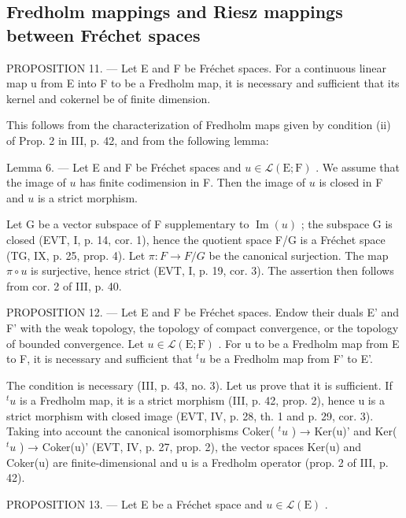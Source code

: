 \subsection{Fredholm mappings and Riesz mappings between Fréchet spaces}

PROPOSITION 11. --- Let E and F be Fréchet spaces. For a continuous linear map u from E into F to be a Fredholm map, it is necessary and sufficient that its kernel and cokernel be of finite dimension.

This follows from the characterization of Fredholm maps given by condition (ii) of Prop. 2 in III, p. 42, and from the following lemma:

Lemma 6. --- Let E and F be Fréchet spaces and \(u \in \mathcal{L}(\mathrm{E};\mathrm{F})\) . We assume that the image of \(u\) has finite codimension in F. Then the image of \(u\) is closed in F and \(u\) is a strict morphism.

Let G be a vector subspace of F supplementary to \(\operatorname{Im}(u)\) ; the subspace G is closed (EVT, I, p. 14, cor. 1), hence the quotient space F/G is a Fréchet space (TG, IX, p. 25, prop. 4). Let \(\pi: F \to F/G\) be the canonical surjection. The map \(\pi \circ u\) is surjective, hence strict (EVT, I, p. 19, cor. 3). The assertion then follows from cor. 2 of III, p. 40.

PROPOSITION 12. --- Let E and F be Fréchet spaces. Endow their duals E' and F' with the weak topology, the topology of compact convergence, or the topology of bounded convergence. Let \(u \in \mathcal{L}(\mathrm{E};\mathrm{F})\) . For u to be a Fredholm map from E to F, it is necessary and sufficient that \({}^{t}u\) be a Fredholm map from F' to E'.

The condition is necessary (III, p. 43, no. 3). Let us prove that it is sufficient. If \(^{t}u\) is a Fredholm map, it is a strict morphism (III, p. 42, prop. 2), hence u is a strict morphism with closed image (EVT, IV, p. 28, th. 1 and p. 29, cor. 3). Taking into account the canonical isomorphisms Coker( \(^{t}u\) ) → Ker(u)' and Ker( \(^{t}u\) ) → Coker(u)' (EVT, IV, p. 27, prop. 2), the vector spaces Ker(u) and Coker(u) are finite-dimensional and u is a Fredholm operator (prop. 2 of III, p. 42).

PROPOSITION 13. --- Let E be a Fréchet space and \(u \in \mathcal{L}(\mathrm{E})\) .

